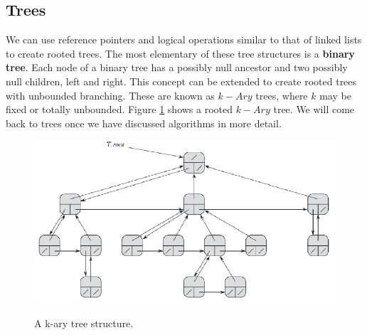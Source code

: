 \documentclass[10pt,a4paper]{article}
\begin{document}
\subsection{Trees}
We can use reference pointers and logical operations similar to that of linked lists to create rooted trees. The most elementary of these tree structures is a {\bf binary tree}. Each node of a binary tree has a possibly null ancestor and two possibly null children, left and right. This concept can be extended to create rooted trees with unbounded branching. These are known as $k-Ary$ trees, where $k$ may be fixed or totally unbounded. Figure \ref{kary} shows a rooted $k-Ary$ tree. We will come back to trees once we have discussed algorithms in more detail.
 \begin{figure}
\caption{A k-ary tree structure.\cite{INTROALG}}
\begin{center}
\includegraphics[scale=0.43]{../images/kary.png}
\label{kary}
\end{center}
\end{figure}
\end{document}
